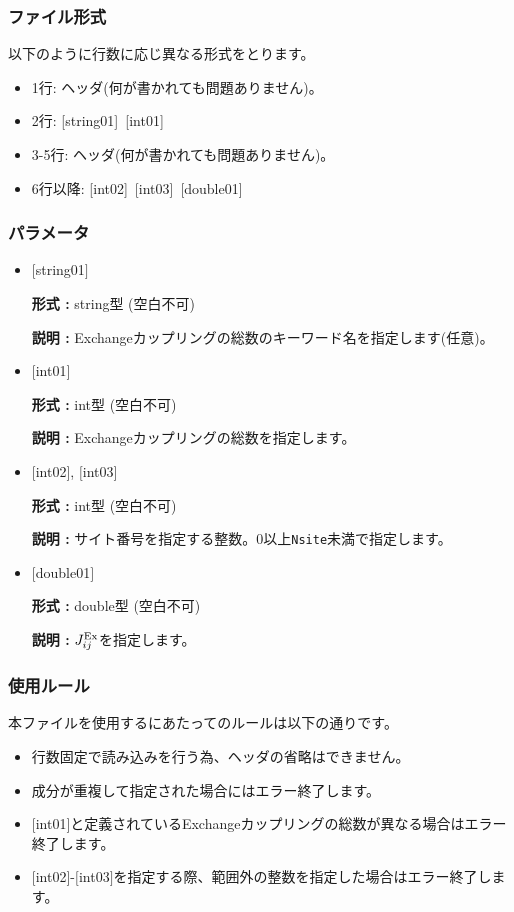 \subsubsection{ファイル形式}
以下のように行数に応じ異なる形式をとります。
 \begin{itemize}
   \item  1行:  ヘッダ(何が書かれても問題ありません)。
   \item  2行:   [string01]~[int01]
   \item  3-5行:  ヘッダ(何が書かれても問題ありません)。
   \item  6行以降:
   [int02]~[int03]~[double01] 
  \end{itemize}
\subsubsection{パラメータ}
 \begin{itemize}

   \item  $[$string01$]$
   
    {\bf 形式 :} string型 (空白不可)

   {\bf 説明 :} Exchangeカップリングの総数のキーワード名を指定します(任意)。

   \item  $[$int01$]$
   
    {\bf 形式 :} int型 (空白不可)

   {\bf 説明 :} Exchangeカップリングの総数を指定します。

  \item  $[$int02$]$, $[$int03$]$
  
 {\bf 形式 :} int型 (空白不可)

{\bf 説明 :} サイト番号を指定する整数。0以上\verb|Nsite|{未満}で指定します。
 
 \item  $[$double01$]$
   
   {\bf 形式 :} double型 (空白不可)

  {\bf 説明 :}  $J_{ij}^{\rm Ex}$を指定します。
  
\end{itemize}

\subsubsection{使用ルール}
本ファイルを使用するにあたってのルールは以下の通りです。
\begin{itemize}
\item 行数固定で読み込みを行う為、ヘッダの省略はできません。
\item 成分が重複して指定された場合にはエラー終了します。
\item $[$int01$]$と定義されているExchangeカップリングの総数が異なる場合はエラー終了します。
\item $[$int02$]$-$[$int03$]$を指定する際、範囲外の整数を指定した場合はエラー終了します。
\end{itemize}

